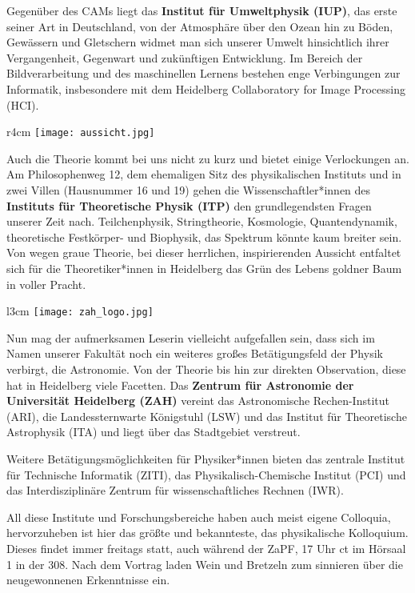 Gegenüber des CAMs liegt das \textbf{Institut für Umweltphysik (IUP)}, das erste seiner Art in Deutschland, von der Atmosphäre über den Ozean hin zu Böden, Gewässern und Gletschern widmet man sich unserer Umwelt hinsichtlich ihrer Vergangenheit, Gegenwart und zukünftigen Entwicklung. Im Bereich der Bildverarbeitung und des maschinellen Lernens bestehen enge Verbingungen zur Informatik, insbesondere mit dem Heidelberg Collaboratory for Image Processing (HCI).

\begin{wrapfigure}{r}{4cm}
\texttt{[image: aussicht.jpg]}
\end{wrapfigure}

Auch die Theorie kommt bei uns nicht zu kurz und bietet einige Verlockungen an. Am Philosophenweg 12, dem ehemaligen Sitz des physikalischen Instituts und in zwei Villen (Hausnummer 16 und 19) gehen die Wissenschaftler*innen des \textbf{Instituts für Theoretische Physik (ITP)} den grundlegendsten Fragen unserer Zeit nach. Teilchenphysik, Stringtheorie, Kosmologie, Quantendynamik, theoretische Festkörper- und Biophysik, das Spektrum könnte kaum breiter sein. Von wegen graue Theorie, bei dieser herrlichen, inspirierenden Aussicht entfaltet sich für die Theoretiker*innen in Heidelberg das Grün des Lebens goldner Baum in voller Pracht.
\begin{wrapfigure}{l}{3cm}
\texttt{[image: zah\_logo.jpg]}
\end{wrapfigure}

Nun mag der aufmerksamen Leserin vielleicht aufgefallen sein, dass sich im Namen unserer Fakultät noch ein weiteres großes Betätigungsfeld der Physik verbirgt, die Astronomie. Von der Theorie bis hin zur direkten Observation, diese hat in Heidelberg viele Facetten.
Das \textbf{Zentrum für Astronomie der Universität Heidelberg (ZAH)} vereint das
Astronomische Rechen-Institut (ARI), die Landessternwarte Königstuhl (LSW) und das Institut für Theoretische Astrophysik (ITA) und liegt über das Stadtgebiet verstreut. 

Weitere Betätigungsmöglichkeiten für Physiker*innen bieten das zentrale Institut für Technische Informatik (ZITI), das Physikalisch-Chemische Institut (PCI) und das Interdisziplinäre Zentrum für wissenschaftliches Rechnen (IWR).

All diese Institute und Forschungsbereiche haben auch meist eigene Colloquia, hervorzuheben ist hier das größte und bekannteste, das physikalische Kolloquium. Dieses findet immer freitags statt, auch während der ZaPF, 17 Uhr ct im Hörsaal 1 in der 308. Nach dem Vortrag laden Wein und Bretzeln zum sinnieren über die neugewonnenen Erkenntnisse ein.

